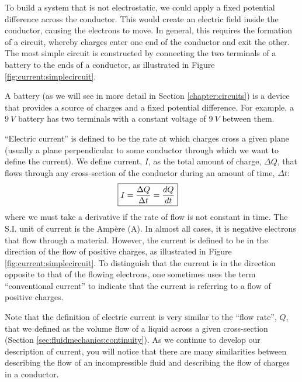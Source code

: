 To build a system that is not electrostatic, we could apply a fixed potential difference across the conductor. This would create an  electric field inside the conductor, causing the electrons to move. In general, this requires the formation of a circuit, whereby charges enter one end of the conductor and exit the other. The most simple circuit is constructed by connecting the two terminals of a battery to the ends of a conductor, as illustrated in Figure \ref{fig:current:simplecircuit}. 


A battery (as we will see in more detail in Section \ref{chapter:circuits}) is a device that provides a source of charges and a fixed potential difference. For example, a $\SI{9}{V}$ battery has two terminals with a constant voltage of $\SI{9}{V}$ between them.


``Electric current'' is defined to be the rate at which charges cross a given plane (usually a plane perpendicular to some conductor through which we want to define the current). We define current, $I$, as the total amount of charge, $\Delta Q$, that flows through any cross-section of the conductor during an amount of time, $\Delta t$:
\begin{align*}
\Aboxed{I=\frac{\Delta Q}{\Delta t}=\frac{dQ}{dt}}
\end{align*}
where we must take a derivative if the rate of flow is not constant in time. The S.I. unit of current is the Amp\`ere (\si{A}). In almost all cases, it is negative electrons that flow through a material. However, the current is defined to be in the direction of the flow of positive charges, as illustrated in Figure \ref{fig:current:simplecircuit}. To distinguish that the current is in the direction opposite to that of the flowing electrons, one sometimes uses the term ``conventional current'' to indicate that the current is referring to a flow of positive charges.

Note that the definition of electric current is very similar to the ``flow rate'', $Q$, that we defined as the volume flow of a liquid across a given cross-section (Section \ref{sec:fluidmechanics:continuity}). As we continue to develop our description of current, you will notice that there are many similarities between describing the flow of an incompressible fluid and describing the flow of charges in a conductor.

